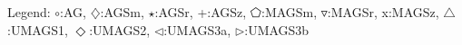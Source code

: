 Legend: {\color{CornflowerBlue}$\circ$}:AG, {\color{Orange}$\diamondsuit$}:AGSm, {\color{Green}$\star$}:AGSr, {\color{red}+}:AGSz, {\color{magenta}$\pentagon$}:MAGSm, {\color{brown}$\triangledown$}:MAGSr, {{}x}:MAGSz, {{}$\triangle$}:UMAGS1, {{}$\Diamond$}:UMAGS2, {{}$\triangleleft$}:UMAGS3a, {{}$\triangleright$}:UMAGS3b